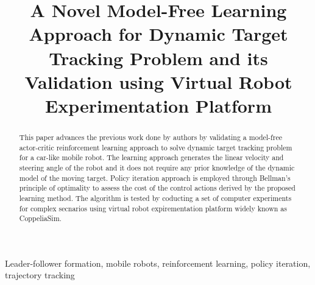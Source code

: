 \documentclass[conference]{IEEEtran}
\begin{document}
\title{A Novel Model-Free Learning Approach for Dynamic Target Tracking Problem and its Validation using Virtual Robot Experimentation Platform 
%  
}

\author{%
%
}

\maketitle

\begin{abstract}

This paper advances the previous work done by authors by validating a model-free actor-critic reinforcement learning approach to solve dynamic target tracking problem for a car-like mobile robot. The learning approach generates the linear velocity and steering angle of the robot and it does not require any prior knowledge of the dynamic model of the moving target. Policy iteration approach is employed through Bellman's principle of optimality to assess the cost of the control actions derived by the proposed learning method. The algorithm is tested by coducting a set of computer experiments for complex secnarios using virtual robot expirementation platform widely known as CoppeliaSim.        

%
\end{abstract}

\begin{IEEEkeywords}
Leader-follower formation, mobile robots, reinforcement learning, policy iteration, trajectory tracking
\end{IEEEkeywords}
\end{document}
